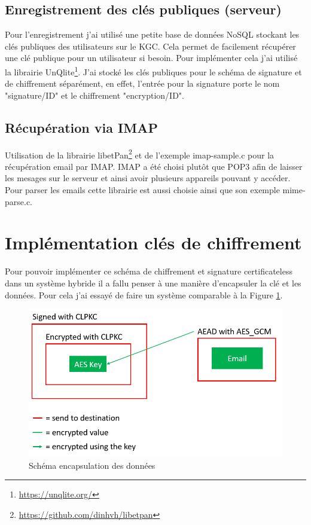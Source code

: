 \subsection{Enregistrement des clés publiques (serveur)}
Pour l'enregistrement j'ai utilisé une petite base de données NoSQL stockant les clés publiques des utilisateurs sur le KGC. Cela permet de facilement récupérer une clé publique pour un utilisateur si besoin. Pour implémenter cela j'ai utilisé la librairie UnQlite\footnote{\url{https://unqlite.org/}}. J'ai stocké les clés publiques pour le schéma de signature et de chiffrement séparément, en effet, l'entrée pour la signature porte le nom "signature/ID" et le chiffrement "encryption/ID".
\subsection{Récupération via IMAP}
Utilisation de la librairie libetPan\footnote{\url{https://github.com/dinhvh/libetpan}} et de l'exemple imap-sample.c pour la récupération email par IMAP. IMAP a été choisi plutôt que POP3 afin de laisser les mesages sur le serveur et ainsi avoir plusieurs appareils pouvant y accéder. Pour parser les emails cette librairie est aussi choisie ainsi que son exemple mime-parse.c.
\section{Implémentation clés  de chiffrement}
Pour pouvoir implémenter ce schéma de chiffrement et signature certificateless dans un système hybride il a fallu penser à une manière d'encapsuler la clé et les données. Pour cela j'ai essayé de faire un système comparable à la Figure \ref{fig:encapsulate}.

\begin{figure}[h!]
	\centering
	\includegraphics[width=12cm]{images/schemaEncapsulation.png}
	\caption{Schéma encapsulation des données}
	\label{fig:encapsulate}
\end{figure}


